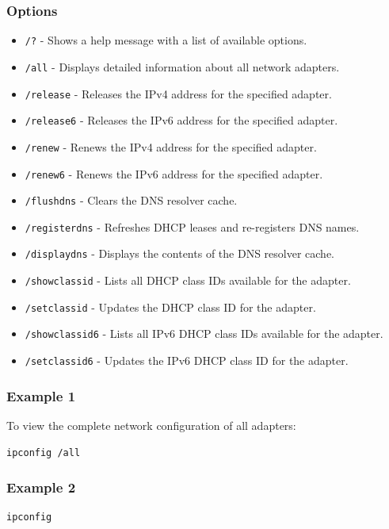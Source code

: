 \documentclass{article}
\begin{document}
\subsubsection{Options}
\begin{itemize}
    \item \texttt{/?} - Shows a help message with a list of available options.
    \item \texttt{/all} - Displays detailed information about all network adapters.
    \item \texttt{/release} - Releases the IPv4 address for the specified adapter.
    \item \texttt{/release6} - Releases the IPv6 address for the specified adapter.
    \item \texttt{/renew} - Renews the IPv4 address for the specified adapter.
    \item \texttt{/renew6} - Renews the IPv6 address for the specified adapter.
    \item \texttt{/flushdns} - Clears the DNS resolver cache.
    \item \texttt{/registerdns} - Refreshes DHCP leases and re-registers DNS names.
    \item \texttt{/displaydns} - Displays the contents of the DNS resolver cache.
    \item \texttt{/showclassid} - Lists all DHCP class IDs available for the adapter.
    \item \texttt{/setclassid} - Updates the DHCP class ID for the adapter.
    \item \texttt{/showclassid6} - Lists all IPv6 DHCP class IDs available for the adapter.
    \item \texttt{/setclassid6} - Updates the IPv6 DHCP class ID for the adapter.
\end{itemize}

\subsubsection{Example 1}
To view the complete network configuration of all adapters:
\begin{verbatim}
ipconfig /all
\end{verbatim}
\subsubsection{Example 2}

\begin{verbatim}
ipconfig 
\end{verbatim}
\end{document}
